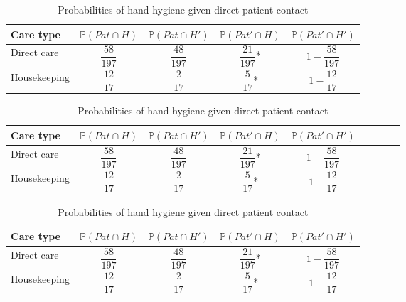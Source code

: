 \documentclass{article}
\begin{document}
\begin{table}[!htbp]
\centering
\begin{tabular}{l*{4}{c}}
\toprule
\textbf{Care type} & $\mathbb{P}(Pat ∩ H)$ & $\mathbb{P}(Pat ∩ H')$ & $\mathbb{P}(Pat' ∩ H)$ & $\mathbb{P}(Pat' ∩ H')$ \\ \midrule
Direct care & $\displaystyle \dfrac{58}{197}$ & $\displaystyle \dfrac{48}{197}$ & $\displaystyle \dfrac{21}{197}$* & $1-\displaystyle \dfrac{58}{197}$ \\\addlinespace%
Housekeeping & $\displaystyle \dfrac{12}{17}$ & $\displaystyle \dfrac{2}{17}$ & $\displaystyle \dfrac{5}{17}$* & $1-\displaystyle \dfrac{12}{17}$ \\ \bottomrule
\end{tabular}
\caption{Probabilities of hand hygiene given direct patient contact}
\label{tab:handwash_given_pat}
\end{table}

\begin{table}[!htbp]
\centering
\begin{tabular}{l*{4}{Sc}}
\toprule
\textbf{Care type} & $\mathbb{P}(Pat ∩ H)$ & $\mathbb{P}(Pat ∩ H')$ & $\mathbb{P}(Pat' ∩ H)$ & $\mathbb{P}(Pat' ∩ H')$ \\ \midrule
Direct care & $\displaystyle \dfrac{58}{197}$ & $\displaystyle \dfrac{48}{197}$ & $\displaystyle \dfrac{21}{197}$* & $1-\displaystyle \dfrac{58}{197}$ \\%
Housekeeping & $\displaystyle \dfrac{12}{17}$ & $\displaystyle \dfrac{2}{17}$ & $\displaystyle \dfrac{5}{17}$* & $1-\displaystyle \dfrac{12}{17}$ \\ \bottomrule
\end{tabular}
\caption{Probabilities of hand hygiene given direct patient contact}
\label{tab:handwash_given_pat}
\end{table}

\begin{table}[!htbp]
\centering\makegapedcells
\begin{tabular}{l*{4}{c}}
\toprule
\textbf{Care type} & $\mathbb{P}(Pat ∩ H)$ & $\mathbb{P}(Pat ∩ H')$ & $\mathbb{P}(Pat' ∩ H)$ & $\mathbb{P}(Pat' ∩ H')$ \\ \midrule
Direct care & $\displaystyle \dfrac{58}{197}$ & $\displaystyle \dfrac{48}{197}$ & $\displaystyle \dfrac{21}{197}$* & $1-\displaystyle \dfrac{58}{197}$ \\%
Housekeeping & $\displaystyle \dfrac{12}{17}$ & $\displaystyle \dfrac{2}{17}$ & $\displaystyle \dfrac{5}{17}$* & $1-\displaystyle \dfrac{12}{17}$ \\ \bottomrule
\end{tabular}
\caption{Probabilities of hand hygiene given direct patient contact}
\label{tab:handwash_given_pat}
\end{table}
\end{document}
